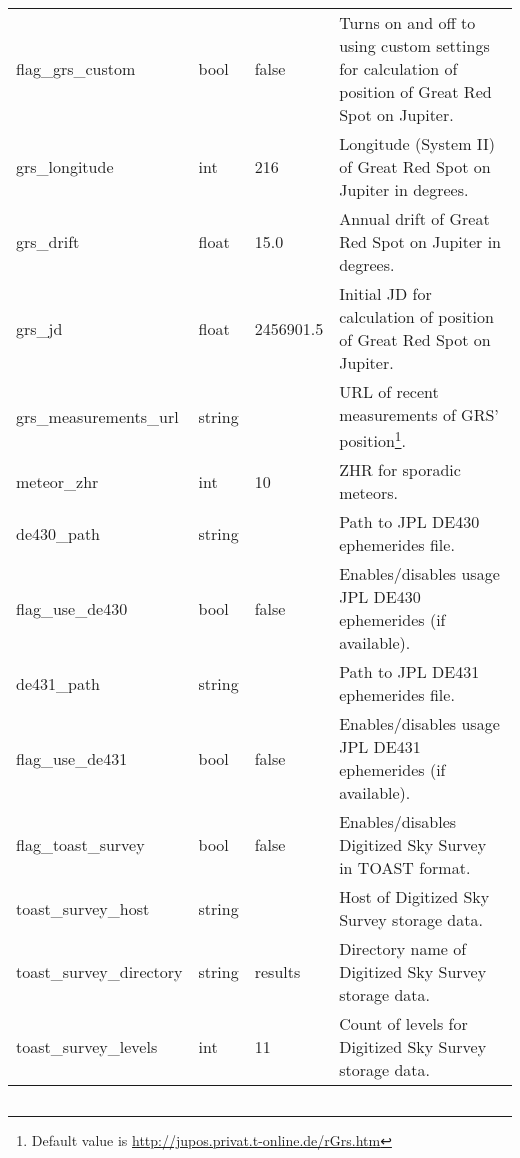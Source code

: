 \begin{longtable}{l|l|l|p{55mm}}
%
flag\_grs\_custom                  & bool   & false & Turns on and off to using custom settings for calculation of position of Great Red Spot on Jupiter.\\%
grs\_longitude                     & int    & 216   & Longitude (System II) of Great Red Spot on Jupiter in degrees.\\%
grs\_drift                         & float  & 15.0  & Annual drift of Great Red Spot on Jupiter in degrees.\\%
grs\_jd                            & float  & 2456901.5 & Initial JD for calculation of position of Great Red Spot on Jupiter.\\%
grs\_measurements\_url             & string &       & URL of recent measurements of GRS' position\footnote{Default value is \url{http://jupos.privat.t-online.de/rGrs.htm}}. \\\midrule
%
meteor\_zhr                        & int    & 10    & ZHR for sporadic meteors.\\\midrule
%
de430\_path                        & string &       & Path to JPL DE430 ephemerides file.\\%
flag\_use\_de430                   & bool   & false & Enables/disables usage JPL DE430 ephemerides (if available).\\%
de431\_path                        & string &       & Path to JPL DE431 ephemerides file.\\%
flag\_use\_de431                   & bool   & false & Enables/disables usage JPL DE431 ephemerides (if available).\\\midrule
%
flag\_toast\_survey                & bool   & false & Enables/disables Digitized Sky Survey in TOAST format.\\%
toast\_survey\_host                & string &       & Host of Digitized Sky Survey storage data.\\%
toast\_survey\_directory           & string & results & Directory name of Digitized Sky Survey storage data.\\%
toast\_survey\_levels              & int    & 11    & Count of levels for Digitized Sky Survey storage data.\\\bottomrule
\end{longtable}

\subsection{}

